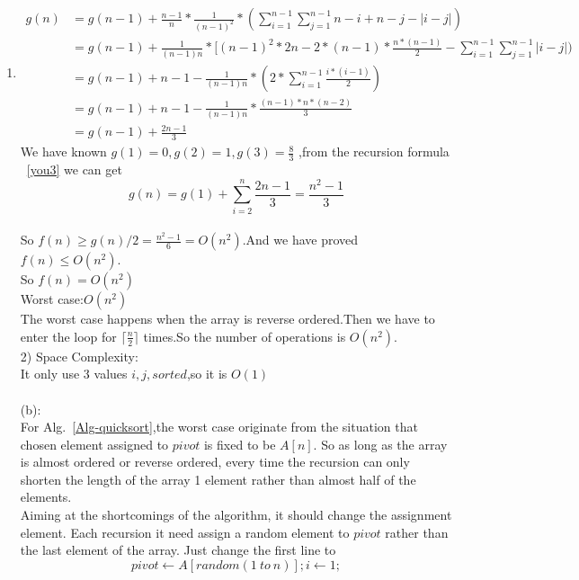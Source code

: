 \documentclass[12pt,a4paper]{article}
\makeatletter
\newtheorem*{solution}{Solution}
\theoremstyle{definition}
\renewenvironment{solution}[1][Solution] {\par\pushQED{\qed}\normalfont\topsep6\p@\@plus6\p@\relax\trivlist\item[\hskip\labelsep\bfseries#1\@addpunct{.}]\ignorespaces}{\popQED\endtrivlist\@endpefalse} \makeatother
\makeatother
\begin{document}
\begin{enumerate}
\begin{solution}
    \begin{equation}
    \begin{aligned}
        g(n)&=g(n-1)+\frac{n-1}{n}*\frac{1}{(n-1)^2}*(\sum_{i=1}^{n-1}\sum_{j=1}^{n-1}n-i+n-j-|i-j|)
        \\&=g(n-1)+\frac{1}{(n-1)n}*[(n-1)^2*2n-2*(n-1)*\frac{n*(n-1)}{2}-\sum_{i=1}^{n-1}\sum_{j=1}^{n-1}|i-j|)
        \\&=g(n-1)+n-1-\frac{1}{(n-1)n}*(2*\sum_{i=1}^{n-1}\frac{i*(i-1)}{2})
        \\&=g(n-1)+n-1-\frac{1}{(n-1)n}*\frac{(n-1)*n*(n-2)}{3}
        \\&=g(n-1)+\frac{2n-1}{3}
    \end{aligned}
    \label{you3}
    \end{equation}
    We have known $g(1)=0,g(2)=1,g(3)=\frac{8}{3}$ ,from the recursion formula ~\ref{you3} we can get
    \begin{equation}
        g(n)=g(1)+\sum_{i=2}^{n}\frac{2n-1}{3}=\frac{n^2-1}{3}
    \end{equation}
    \\So $f(n)\ge g(n)/2=\frac{n^2-1}{6}=O(n^2)$.And we have proved $f(n)\le O(n^2)$.\\So $f(n)=O(n^2)$
    \\Worst case:$O(n^2)$
    \\The worst case happens when the array is reverse ordered.Then we have to enter the loop for $\lceil \frac{n}{2}\rceil$ times.So the number of operations is $O(n^2)$.
        \\
    2) Space Complexity:\\
    It only use 3 values $i,j,sorted$,so it is $O(1)$\\
    \\
    (b):\\For Alg.~\ref{Alg-quicksort},the worst case originate from the situation that chosen element assigned to $pivot$ is fixed to be $A[n]$. So as long as the array is almost ordered or reverse ordered, every time the recursion can only shorten the length of the array 1 element rather than almost half of the elements.
    \\Aiming at the shortcomings of the algorithm, it should change the assignment element. Each recursion it need assign a random element to $pivot$ rather than the last element of the array. Just change the first line to 
    \begin{equation}
        pivot \leftarrow A[random(1~to~n)];i\leftarrow 1;
    \end{equation}
    \end{solution}
    

\end{enumerate}
\end{document}

